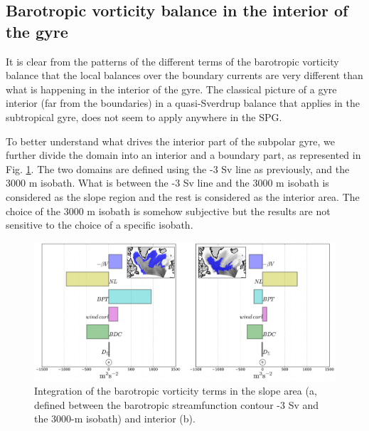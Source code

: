 \documentclass[os, manuscript]{copernicus}
\providecommand{\DIFaddbegin}{} %
\providecommand{\DIFaddend}{} %
\begin{document}
\DIFaddbegin 


\DIFaddend \subsection{Barotropic vorticity balance in the interior of the gyre}

It is clear from the patterns of the different terms of the barotropic vorticity balance that the local balances over the boundary currents are very different than what is happening in the interior of the gyre. The classical picture of a gyre interior (far from the boundaries) in a quasi-Sverdrup balance that applies in the subtropical gyre,  does not seem to apply anywhere in the SPG. 

To better understand what drives the interior part of the subpolar gyre, we further divide the domain into an interior and a boundary part, as represented in Fig. \ref{f10}. The two domains are defined using the -3 Sv line as previously, and the 3000 m isobath. What is between the -3 Sv line and the 3000 m isobath is considered as the slope region and the rest is considered as the interior area. The choice of the 3000 m isobath is somehow subjective but the results are not sensitive to the choice of a specific isobath. 

\begin{figure}[t]
\includegraphics[width=14cm]{../fig_os/f10.pdf}
\caption{Integration of the barotropic vorticity terms in the slope area (a, defined between the barotropic streamfunction contour -3 Sv and the 3000-m isobath) and interior (b).}
\label{f10}
\end{figure} 
\end{document}
